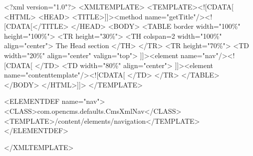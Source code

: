 <?xml version="1.0"?>
<XMLTEMPLATE>
<TEMPLATE><![CDATA[
    <HTML>
    <HEAD>
        <TITLE>]]><method name="getTitle"/><![CDATA[</TITLE>
    </HEAD>
    <BODY>
    <TABLE border width="100\%" height="100\%">
        <TR height="30\%">
        <TH colspan=2 width="100\%" align="center">
            The Head section
        </TH>
        </TR>
        <TR height="70\%">
        <TD width="20\%" align="center" valign="top">
            ]]><element name="nav"/><![CDATA[
        </TD>
        <TD width="80\%" align="center">
            ]]><element name="contenttemplate"/><![CDATA[
        </TD>
    </TR>
    </TABLE>
    </BODY>
    </HTML>]]>
</TEMPLATE>

<ELEMENTDEF name="nav">
    <CLASS>com.opencms.defaults.CmsXmlNav</CLASS>
    <TEMPLATE>/content/elements/navigation</TEMPLATE>
</ELEMENTDEF>

</XMLTEMPLATE>
